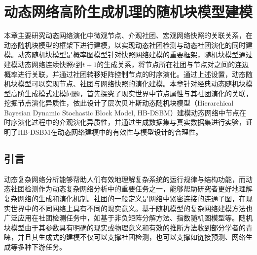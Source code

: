 \baselineskip 20pt

\chapter{动态网络高阶生成机理的随机块模型建模} 
\label{chap:3}
本章主要研究动态网络演化中微观节点、介观社团、宏观网络快照的关联关系，在动态随机块模型的框架下进行建模，以实现动态社团检测与动态社团演化的同时建模。动态随机块模型是概率图模型针对快照网络建模的重要框架，随机块模型通过建模动态网络连续快照$t$到$t+1$的生成关系，将节点所在社团与节点对之间的连边概率进行关联，并通过社团转移矩阵控制节点的时序演化。通过上述设置，动态随机块模型可以实现节点、社团与网络快照的演化建模。本章针对经典动态随机块模型高阶生成模式建模问题，首先探究了现实世界中节点属性与其社团演化的关联，挖掘节点演化异质性，依此设计了层次贝叶斯动态随机块模型（Hierarchical Bayesian Dynamic Stochastic Block Model, HB-DSBM）建模动态网络中节点在时序演化过程中的介观演化异质性，并通过生成数据集与真实数据集进行实验，证明了HB-DSBM在动态网络建模中的有效性与模型设计的合理性。
\section{引言}
动态复杂网络分析能够帮助人们有效地理解复杂系统的运行规律与结构功能\cite{papadopoulos2012popularity}，而动态社团检测作为动态复杂网络分析中的重要任务之一，能够帮助研究者更好地理解复杂网络的生成和演化机制\cite{martinet2020robust}。社团的一般定义是网络中紧密连接的连通子图，在现实世界中的不同网络上具有不同的现实意义\cite{jin2021survey}。基于随机模型的复杂网络建模方法也广泛应用在社团检测任务中，如基于非负矩阵分解方法、指数随机图模型等。随机块模型由于其参数具有明确的现实或物理意义和有效的推断方法收到部分学者的青睐，并且其生成式的建模不仅可以支撑社团检测，也可以支撑如链接预测\cite{kumar2024community}、网络生成\cite{dreveton2024exact}等多种下游任务。

